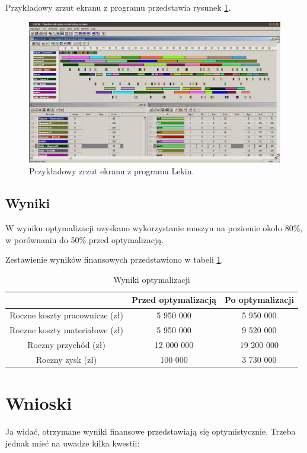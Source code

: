 \documentclass{article}
\begin{document}
Przykładowy zrzut ekranu z programu przedstawia rysunek \ref{fig:screen}.

\begin{figure}[H]
  \centering
  \includegraphics[width=12cm]{screenshot.png}
  \caption{Przykładowy zrzut ekranu z programu Lekin.}
  \label{fig:screen}
\end{figure}


\subsection{Wyniki}

W wyniku optymalizacji uzyskano wykorzystanie maszyn na poziomie około 80\%, w porównaniu do 50\% przed optymalizacją.

Zestawienie wyników finansowych przedstawiono w tabeli \ref{table:opt}.

\begin{table}[H]
\center
\begin{tabular}{ c | c | c }
   & \textbf{Przed optymalizacją} & \textbf{Po optymalizacji} \\ \hline
  Roczne koszty pracownicze (zł) & 5 950 000 & 5 950 000 \\
  Roczne koszty materiałowe (zł) & 5 950 000 & 9 520 000 \\
  Roczny przychód (zł) & 12 000 000 & 19 200 000 \\
  Roczny zysk (zł) & 100 000 & 3 730 000 \\
\end{tabular}
\caption{Wyniki optymalizacji}
\label{table:opt}
\end{table}

\section{Wnioski}

Ja widać, otrzymane wyniki finansowe przedstawiają się optymistycznie.
Trzeba jednak mieć na uwadze kilka kwestii:
\end{document}
